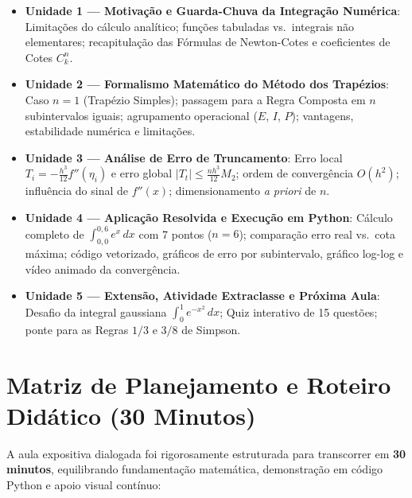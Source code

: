 \documentclass[11pt,a4paper]{article}
\begin{document}
\begin{itemize}[leftmargin=1.4em]
    \item \textbf{Unidade 1 --- Motivação e Guarda-Chuva da Integração Numérica}: Limitações do cálculo analítico; funções tabuladas vs.\ integrais não elementares; recapitulação das Fórmulas de Newton-Cotes e coeficientes de Cotes $C_k^n$.
    \item \textbf{Unidade 2 --- Formalismo Matemático do Método dos Trapézios}: Caso $n=1$ (Trapézio Simples); passagem para a Regra Composta em $n$ subintervalos iguais; agrupamento operacional ($E$, $I$, $P$); vantagens, estabilidade numérica e limitações.
    \item \textbf{Unidade 3 --- Análise de Erro de Truncamento}: Erro local $T_i = -\frac{h^3}{12}f''(\eta_i)$ e erro global $|T_t| \le \frac{nh^3}{12}M_2$; ordem de convergência $O(h^2)$; influência do sinal de $f''(x)$; dimensionamento \emph{a priori} de $n$.
    \item \textbf{Unidade 4 --- Aplicação Resolvida e Execução em Python}: Cálculo completo de $\int_{0,0}^{0,6} e^x\,dx$ com 7 pontos ($n=6$); comparação erro real vs.\ cota máxima; código vetorizado, gráficos de erro por subintervalo, gráfico log-log e vídeo animado da convergência.
    \item \textbf{Unidade 5 --- Extensão, Atividade Extraclasse e Próxima Aula}: Desafio da integral gaussiana $\int_0^1 e^{-x^2}\,dx$; Quiz interativo de 15 questões; ponte para as Regras $1/3$ e $3/8$ de Simpson.
\end{itemize}

\section{Matriz de Planejamento e Roteiro Didático (30 Minutos)}

A aula expositiva dialogada foi rigorosamente estruturada para transcorrer em \textbf{30 minutos}, equilibrando fundamentação matemática, demonstração em código Python e apoio visual contínuo:
\end{document}
